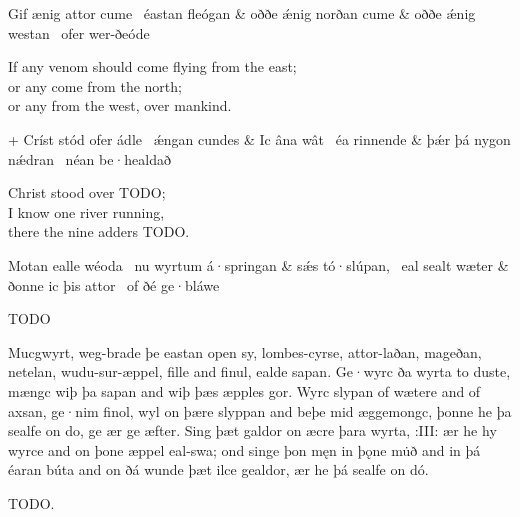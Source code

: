 \bvg
\bva Gif ænig attor cume \hld\ éastan fleógan &
oððe ǽnig norðan cume &
oððe ǽnig westan \hld\ ofer wer-ðeóde\eva

\bvb If any venom should come flying from the east; \\
or any come from the north; \\
or any from the west, over mankind.\evb\evg


\bvg
\bva + Críst stód ofer ádle \hld\ ǽngan cundes &
Ic âna wât \hld\ éa rinnende &
þǽr þá nygon nǽdran \hld\ néan be·healdað\eva

\bvb Christ stood over TODO; \\
I know one river running, \\
there the nine adders TODO.\evb\evg


\bvg
\bva Motan ealle wéoda \hld\ nu wyrtum á·springan &
sǽs tó·slúpan, \hld\ eal sealt wæter &
ðonne ic þis attor \hld\ of ðé ge·bláwe\eva

\bvb TODO\evb\evg


\bpg\bpa Mucgwyrt, weg-brade þe eastan open sy, lombes-cyrse, attor-laðan, mageðan, netelan, wudu-sur-æppel, fille and finul, ealde sapan. Ge·wyrc ða wyrta to duste, mængc wiþ þa sapan and wiþ þæs æpples gor. Wyrc slypan of wætere and of axsan, ge·nim finol, wyl on þære slyppan and beþe mid æggemongc, þonne he þa sealfe on do, ge ær ge æfter. Sing þæt galdor on æcre þara wyrta, :III: ær he hy wyrce and on þone æppel eal-swa; ond singe þon męn in þǫne mu̇ð and in þá éaran búta and on ðá wunde þæt ilce gealdor, ær he þá sealfe on dó.\epa

\bpb TODO.\epb\epg

\sectionline
